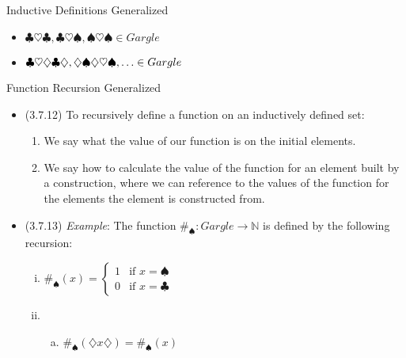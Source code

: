 \documentclass[../slides.tex]{subfiles}
\begin{document}
\begin{frame}{Inductive Definitions Generalized}
\begin{itemize}
\begin{itemize}
					\item $\clubsuit\heartsuit\clubsuit, \clubsuit\heartsuit\spadesuit, \spadesuit\heartsuit\spadesuit\in Gargle$
				
					\item $\clubsuit\heartsuit\diamondsuit\clubsuit\diamondsuit, \diamondsuit\spadesuit\diamondsuit\heartsuit\spadesuit,\mathellipsis\in Gargle$

				
				\end{itemize}
	
	\end{itemize}

\end{frame}

\begin{frame}{Function Recursion Generalized}

	\begin{itemize}
	
		\item (3.7.12) To recursively define a function on an inductively defined set:
		\begin{enumerate}[1.]
		
			\item We say what the value of our function is on the initial elements.
			
			\item We say how to calculate the value of the function for an element built by a construction, where we can reference to the values of the function for the elements the element is constructed from.
		
		\end{enumerate}
		
	\item (3.7.13) \emph{Example}: The function $\#_\spadesuit:Gargle\to\mathbb{N}$ is defined by the following recursion:
		
	\begin{enumerate}[(i)]
		
			\item $\#_\spadesuit(x)=\begin{cases} 1 & \text{if }x=\spadesuit
			\\0 &\text{if }x=\clubsuit\end{cases}$
			
			\item \begin{enumerate}[(a)]
					
					\item  $\#_\spadesuit( \diamondsuit x\diamondsuit)=\#_\spadesuit(x)$


\end{enumerate}
\end{enumerate}
\end{itemize}
\end{frame}
\end{document}
